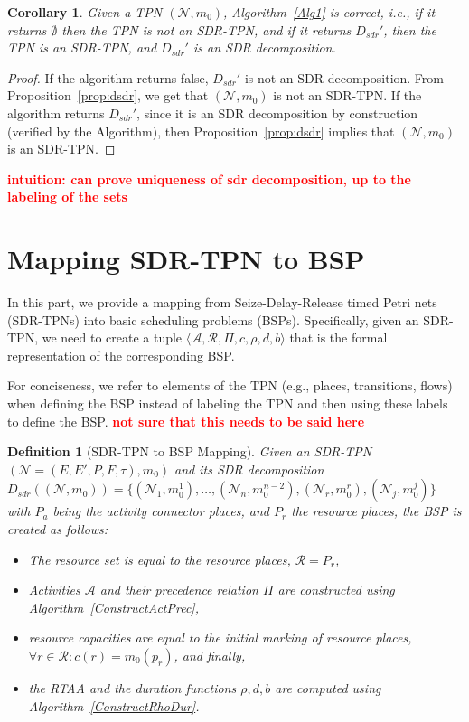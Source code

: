 \documentclass[11pt]{article}
\newcommand{\todo}[1]{\textcolor{red}{\bf {#1}}}
\newtheorem{mydef}{Definition}
\newtheorem{mycor}{Corollary}
\begin{document}
\begin{mycor}
	Given a TPN $(\mathcal{N},m_0)$, Algorithm~\ref{Alg1} is correct, i.e., if it returns $\emptyset$ then the TPN 
	is not an SDR-TPN, and if it returns $D_{sdr}'$, then the TPN is an SDR-TPN, and $D_{sdr}'$ is an SDR decomposition.
\end{mycor}
\begin{proof}
	If the algorithm returns false, $D_{sdr}'$ is not an SDR decomposition. From Proposition~\ref{prop:dsdr},
	we get that  $(\mathcal{N},m_0)$ is not an SDR-TPN. If the algorithm returns $D_{sdr}'$, since it is an SDR decomposition
	by construction (verified by the Algorithm), then Proposition~\ref{prop:dsdr} implies that
	$(\mathcal{N},m_0)$ is an SDR-TPN.
\end{proof}
\todo{intuition: can prove uniqueness of sdr decomposition, up to the labeling of the sets}

\section{Mapping SDR-TPN to BSP} 



In this part, we provide a 
mapping from Seize-Delay-Release 
timed Petri nets (SDR-TPNs) into 
basic scheduling problems (BSPs). Specifically, 
given an SDR-TPN, we 
need to create a tuple $\langle  \mathcal{A}, \mathcal{R}, \varPi, c, \rho, d, b \rangle$ that 
is the formal representation of the corresponding BSP.

For conciseness, 
we refer to elements of the TPN 
(e.g., places, transitions, flows)
when defining the BSP instead of labeling the TPN
and then using these labels to define the BSP. \todo{not sure that this needs to be said here}



\begin{mydef}[SDR-TPN to BSP Mapping]
\begin{sloppypar} Given an SDR-TPN $(\mathcal{N} = (E, E', P, F, \tau), m_0)$ 
and its SDR decomposition 
$D_{sdr}((\mathcal{N}, m_0)) = \{(\mathcal{N}_1, m_0^1), \ldots, (\mathcal{N}_n, m_0^{n-2}) , (\mathcal{N}_r, m_0^{r}), (\mathcal{N}_j, m_0^{j})\}$ with $P_a$ being the activity connector places, and $P_r$ the resource places,
the BSP is created as follows:\end{sloppypar}
\begin{itemize}
	\item The resource set is equal 
	to the resource places, $\mathcal{R} = P_r$,
	\item Activities $\mathcal{A}$ and their precedence
	relation $\varPi$ are constructed using Algorithm~\ref{ConstructActPrec},
	\item resource capacities are equal to the 
	initial marking
	of resource places, $\forall r \in \mathcal{R}: c(r) = m_0(p_r)$, and finally, 
	\item the RTAA and the duration functions $\rho, d, b$ are computed using Algorithm~\ref{ConstructRhoDur}.	
\end{itemize} 
\end{mydef}
\end{document}
